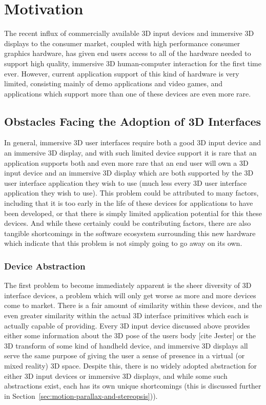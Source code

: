 \chapter{Motivation}
The recent influx of commercially available 3D input devices and immersive 3D displays to the consumer market, coupled with high performance consumer graphics hardware, has given end users access to all of the hardware needed to support high quality, immersive 3D human-computer interaction for the first time ever. However, current application support of this kind of hardware is very limited, consisting mainly of demo applications and video games, and applications which support more than one of these devices are even more rare. 

\section{Obstacles Facing the Adoption of 3D Interfaces}

In general, immersive 3D user interfaces require both a good 3D input device and an immersive 3D display, and with such limited device support it is rare that an application supports both and even more rare that an end user will own a 3D input device and an immersive 3D display which are both supported by the 3D user interface application they wish to use (much less every 3D user interface application they wish to use). This problem could be attributed to many factors, including that it is too early in the life of these devices for applications to have been developed, or that there is simply limited application potential for this these devices. And while these certainly could be contributing factors, there are also tangible shortcomings in the software ecosystem surrounding this new hardware which indicate that this problem is not simply going to go away on its own.

\subsection{Device Abstraction}

The first problem to become immediately apparent is the sheer diversity of 3D interface devices, a problem which will only get worse as more and more devices come to market. There is a fair amount of similarity within these devices, and the even greater similarity within the actual 3D interface primitives which each is actually capable of providing. Every 3D input device discussed above provides either some information about the 3D pose of the users body [cite Jester] or the 3D transform of some kind of handheld device, and immersive 3D displays all serve the same purpose of giving the user a sense of presence in a virtual (or mixed reality) 3D space. Despite this, there is no widely adopted abstraction for either 3D input devices or immersive 3D displays, and while some such abstractions exist, each has its own unique shortcomings (this is discussed further in Section~\ref{sec:motion-parallax-and-stereopsis})). 

